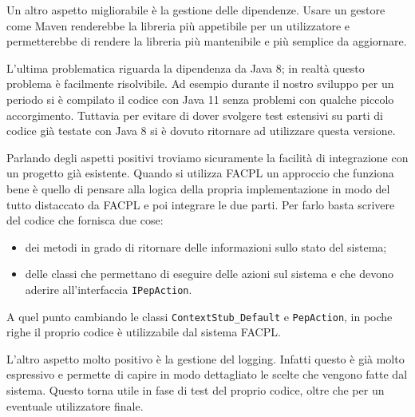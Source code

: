 Un altro aspetto migliorabile è la gestione delle dipendenze. Usare un gestore come Maven renderebbe la libreria più appetibile per un utilizzatore e permetterebbe di rendere la libreria più mantenibile e più semplice da aggiornare.\par
L'ultima problematica riguarda la dipendenza da Java 8; in realtà questo problema è facilmente risolvibile. Ad esempio durante il nostro  sviluppo per un periodo si è compilato il codice con Java 11 senza problemi con qualche piccolo accorgimento. Tuttavia per evitare di dover svolgere test estensivi su parti di codice già testate con Java 8 si è dovuto ritornare ad utilizzare questa versione.\par
Parlando degli aspetti positivi troviamo sicuramente la facilità di integrazione con un progetto già esistente. Quando si utilizza FACPL un approccio che funziona bene è quello di pensare alla logica della propria implementazione in modo del tutto distaccato da FACPL e poi integrare le due parti. Per farlo basta scrivere del codice che fornisca due cose:
\begin{itemize}
    \item dei metodi in grado di ritornare delle informazioni sullo stato del sistema;
    \item delle classi che permettano di eseguire delle azioni sul sistema e che devono aderire all'interfaccia \texttt{IPepAction}.
\end{itemize}
A quel punto cambiando le classi \texttt{ContextStub\_Default} e \texttt{PepAction}, in poche righe il proprio codice è utilizzabile dal sistema FACPL.\par
L'altro aspetto molto positivo è la gestione del logging. Infatti questo è già molto espressivo e permette di capire in modo dettagliato le scelte che vengono fatte dal sistema. Questo torna utile in fase di test del proprio codice, oltre che per un eventuale utilizzatore finale.\par

